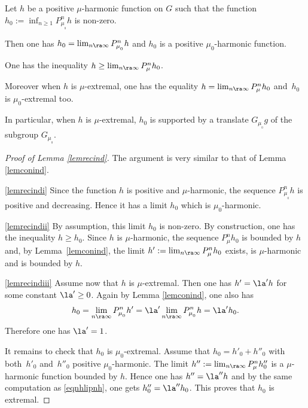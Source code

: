\begin{Lem}
\label{lemrecind}
Let $h$ be a positive $\mu$-harmonic function on $G$ such that
the function $h_0:=\inf_{n\geq 1}P^n_{\mu_{_0}}h$ is non-zero.
\begin{enumeratei}
\item\label{lemrecindi}
Then
one has
$h_0=\lim_{n\ra\infty}P^n_{\mu_{_0}}h$ and
$h_0$ is a positive $\mu_0$-harmonic function.
\item\label{lemrecindii}
One has the inequality
$h\geq\lim_{n\ra\infty}P^n_{\mu}h_0$.
\item\label{lemrecindiii}
Moreover when $h$ is $\mu$-extremal, one has the equality
$h=\lim_{n\ra\infty}P^n_{\mu}h_0$ and~$h_0$ is $\mu_0$-extremal too.
\end{enumeratei}
\end{Lem}

In particular, when $h$ is $\mu$-extremal, $h_0$ is supported by a translate
$G_{\mu_{_0}}g$ of the subgroup $G_{\mu_{_0}}$.

\begin{proof}[Proof of Lemma \ref{lemrecind}]
The argument is very similar to that of Lemma \ref{lemconind}.

\eqref{lemrecindi}
Since the function $h$ is positive and $\mu$-harmonic, the sequence
$P^n_{\mu_{_0}}h$ is positive and decreasing. Hence it has a limit $h_0$
which is $\mu_0$-harmonic.

\eqref{lemrecindii}
By assumption, this limit $h_0$ is non-zero. By construction,
one has the inequality
$h\geq h_0$. Since $h$ is $\mu$-harmonic, the sequence
$ P^n_{\mu}h_0$ is bounded by $h$ and, by Lemma~\ref{lemconind},
the limit $h':=\lim_{n\ra\infty}P^n_\mu h_0$
exists, is $\mu$-harmonic and is bounded by $h$.

\eqref{lemrecindiii}
Assume now that $h$ is $\mu$-extremal.
Then one has $h'=\la' h$ for some constant $\la'\geq 0$.
Again by Lemma \ref{lemconind}, one also has
\begin{equation}
\label{eqnhlipnh}
h_0=\lim_{n\ra\infty}P^n_{\mu_{_0}}h'
=\la'\lim_{n\ra\infty}P^n_{\mu_{_0}}h=\la' h_0.
\end{equation}
Therefore one has $\la'=1$.

It remains to check that $h_0$ is $\mu_0$-extremal.
Assume that $h_0=h'_0+h''_0$ with both~$h'_0$ and~$h''_0$
positive $\mu_0$-harmonic.
The limit
$h'':=\lim_{n\ra\infty}P^n_{\mu}h''_0$
is a $\mu$-harmonic function bounded by $h$.
Hence one has $h''=\la'' h$
and by the same computation as \eqref{eqnhlipnh}, one gets
$h''_0=\la'' h_0$.
This proves that $h_0$ is extremal.
\end{proof}

